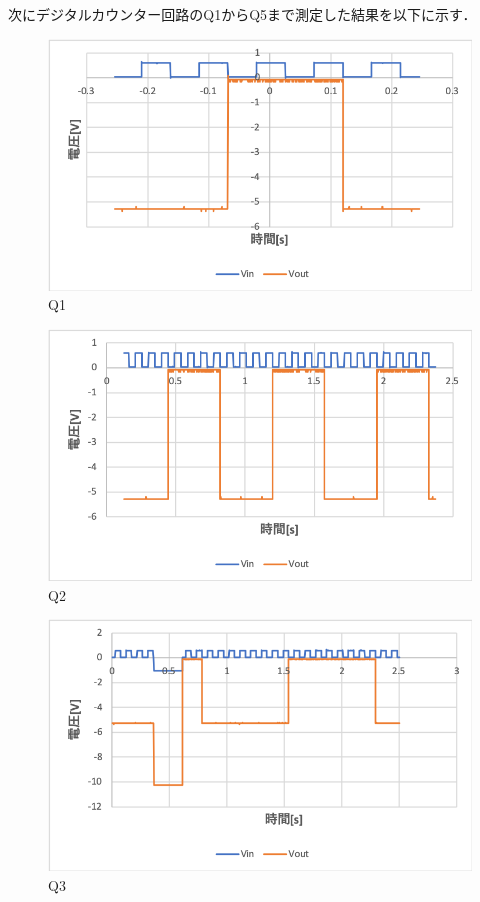 \documentclass[11pt, a4paper,twocolumn]{jarticle}
\begin{document}
次にデジタルカウンター回路のQ1からQ5まで測定した結果を以下に示す．

\begin{figure}[htbp]
 \begin{center}
  \includegraphics[width=0.8\linewidth]{fig23.png}
 \end{center}
 \caption{Q1}
 \label{fig:23}
\end{figure}

\begin{figure}[htbp]
 \begin{center}
  \includegraphics[width=0.8\linewidth]{fig24.png}
 \end{center}
 \caption{Q2}
 \label{fig:24}
\end{figure}

\begin{figure}[htbp]
 \begin{center}
  \includegraphics[width=0.8\linewidth]{fig25.png}
 \end{center}
 \caption{Q3}
 \label{fig:25}
\end{figure}
\end{document}
